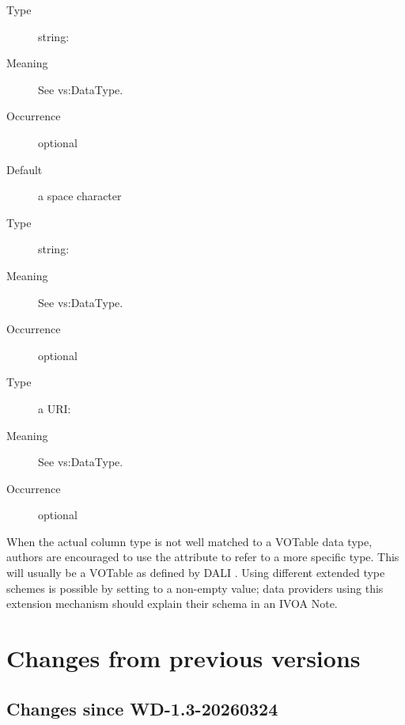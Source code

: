 \documentclass[11pt,a4paper]{ivoa}
\begin{document}
\begin{generated}
\begin{bigdescription}
\begin{description}
\end{description}
\item[delim]
\begin{description}
\item[Type] string: 
\item[Meaning] See vs:DataType.
\item[Occurrence] optional
\item[Default] a space character
\end{description}
\item[extendedType]
\begin{description}
\item[Type] string: 
\item[Meaning] See vs:DataType.
\item[Occurrence] optional
\end{description}
\item[extendedSchema]
\begin{description}
\item[Type] a URI: 
\item[Meaning] See vs:DataType.
\item[Occurrence] optional
\end{description}


\end{bigdescription}\endgroup

\endgroup
\end{generated}




When the actual column type is not
well matched to a VOTable data type, authors are
encouraged to use the  attribute to refer to
a more specific type.  This will usually be a VOTable  as
defined by DALI \citep{2017ivoa.spec.0517D}.  Using different extended
type schemes is possible by setting  to a
non-empty value; data providers using this extension mechanism should
explain their schema in an IVOA Note.

\appendix

\section{Changes from previous versions}

\subsection{Changes since WD-1.3-20260324}
\end{document}
